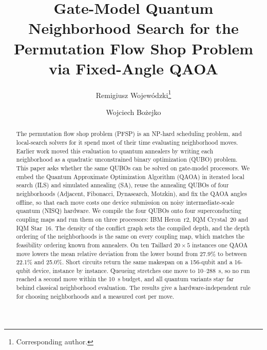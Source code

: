 \documentclass{svproc}
\newif\ifblind
\newcommand{\rev}[1]{{\color{blue}#1}}
\newcommand{\rev}[1]{#1}
\begin{document}
\mainmatter

\title{Gate-Model Quantum Neighborhood Search for the Permutation
       Flow Shop Problem via Fixed-Angle QAOA}

\ifblind
  \author{}
  \authorrunning{}
  \institute{}
\else
  \author{Remigiusz Wojew\'{o}dzki\thanks{Corresponding author.} \and Wojciech Bo\.{z}ejko}
\fi

\maketitle

\begin{abstract}
\rev{The permutation flow shop problem (PFSP) is an NP-hard scheduling problem,
and local-search solvers for it spend most of their time evaluating
neighborhood moves. Earlier work moved this evaluation to quantum annealers by
writing each neighborhood as a quadratic unconstrained binary optimization
(QUBO) problem. This paper asks whether the same QUBOs can be solved on
gate-model processors. We embed the Quantum Approximate Optimization Algorithm
(QAOA) in iterated local search (ILS) and simulated annealing (SA), reuse the
annealing QUBOs of four neighborhoods (Adjacent, Fibonacci, Dynasearch,
Motzkin), and fix the QAOA angles offline, so that each move costs one device
submission on noisy intermediate-scale quantum (NISQ) hardware. We compile the
four QUBOs onto four superconducting coupling maps and run them on three
processors: IBM Heron~r2, IQM Crystal~20 and IQM Star~16. The density of the
conflict graph sets the compiled depth, and the depth ordering of the
neighborhoods is the same on every coupling map, which matches the feasibility
ordering known from annealers. On ten Taillard $20\times5$ instances one QAOA
move lowers the mean relative deviation from the lower bound from 27.9\% to
between 22.1\% and 25.0\%. Short circuits return the same makespan on a
156-qubit and a 16-qubit device, instance by instance. Queueing stretches one
move to 10--288~s, so no run reached a second move within the 10~s budget, and
all quantum variants stay far behind classical neighborhood evaluation. The
results give a hardware-independent rule for choosing neighborhoods and a
measured cost per move.}
\end{abstract}
\end{document}

